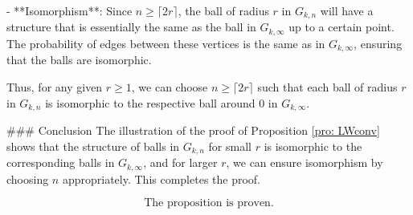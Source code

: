 - **Isomorphism**: Since \( n \geq \lceil 2r \rceil \), the ball of radius \( r \) in \( G_{k,n} \) will have a structure that is essentially the same as the ball in \( G_{k,\infty} \) up to a certain point. The probability of edges between these vertices is the same as in \( G_{k,\infty} \), ensuring that the balls are isomorphic.

Thus, for any given \( r \geq 1 \), we can choose \( n \geq \lceil 2r \rceil \) such that each ball of radius \( r \) in \( G_{k,n} \) is isomorphic to the respective ball around \( 0 \) in \( G_{k,\infty} \).

### Conclusion
The illustration of the proof of Proposition \ref{pro: LWconv} shows that the structure of balls in \( G_{k,n} \) for small \( r \) is isomorphic to the corresponding balls in \( G_{k,\infty} \), and for larger \( r \), we can ensure isomorphism by choosing \( n \) appropriately. This completes the proof.

\[
\boxed{\text{The proposition is proven.}}
\]